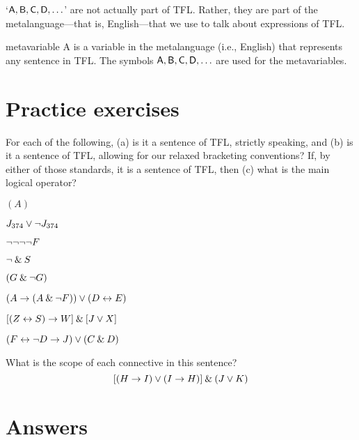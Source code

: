 `$\mathsf{A}, \mathsf{B}, \mathsf{C}, \mathsf{D}, \ldots$' are not actually part of TFL. Rather, they are part of the metalanguage---that is, English---that we use to talk about expressions of TFL. 
	
\begin{factboxy}{metavariable}
A  is a variable in the metalanguage (i.e., English) that represents any sentence in TFL. The symbols $\mathsf{A}, \mathsf{B}, \mathsf{C}, \mathsf{D}, \ldots$ are used for the metavariables.
\end{factboxy}



\section{Practice exercises}
\setcounter{ProbPart}{0}

\problempart
\label{pr.wiffTFL}
For each of the following, (a) is it a sentence of TFL, strictly speaking, and (b) is it a sentence of TFL, allowing for our relaxed bracketing conventions? If, by either of those standards, it is a sentence of TFL, then (c) what is the main logical operator?
\begin{earg}
\item $(A)$
\item $J_{374} \vee {\neg} J_{374}$
\item ${\neg} {\neg} {\neg} {\neg} F$
\item ${\neg} \mathbin{\&} S$
\item $(G \mathbin{\&} {\neg} G)$
\item $(A \rightarrow (A \mathbin{\&} {\neg} F)) \vee (D \leftrightarrow E)$
\item $[(Z \leftrightarrow S) \rightarrow W] \mathbin{\&} [J \vee X]$
\item $(F \leftrightarrow {\neg} D \rightarrow J) \vee (C \mathbin{\&} D)$
\end{earg}


\problempart
What is the scope of each connective in this sentence?
$$[(H \rightarrow I) \vee (I \rightarrow H)] \mathbin{\&} (J \vee K)$$



\section{Answers}
\setcounter{ProbPart}{0}

